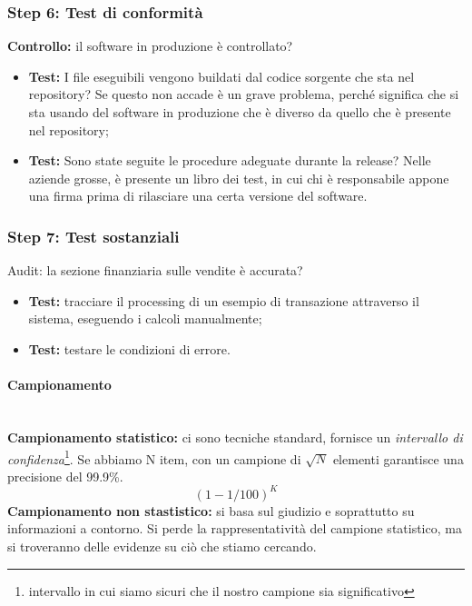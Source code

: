 \subsubsection{Step 6: Test di conformità}

\textbf{Controllo:} il software in produzione è controllato?
\begin{itemize}
\item \textbf{Test:} I file eseguibili vengono buildati dal codice sorgente che
sta nel repository? Se questo non accade è un grave problema, perché significa
che si sta usando del software in produzione che è diverso da quello che è
presente nel repository;
\item \textbf{Test:} Sono state seguite le procedure adeguate durante la
release? Nelle aziende grosse, è presente un libro dei test, in cui chi è
responsabile appone una firma prima di rilasciare una certa versione del
software.
\end{itemize}


\subsubsection{Step 7: Test sostanziali}

Audit: la sezione finanziaria sulle vendite è accurata?

\begin{itemize}
\item \textbf{Test:} tracciare il processing di un esempio di transazione
attraverso il sistema, eseguendo i calcoli manualmente;
\item \textbf{Test:} testare le condizioni di errore.
\end{itemize}


\paragraph{Campionamento}\mbox{}\\

\textbf{Campionamento statistico:} ci sono tecniche standard, fornisce un
\textit{intervallo di confidenza}\footnote{intervallo in cui siamo sicuri che
il nostro campione sia significativo}. Se abbiamo N item, con un campione di
$\sqrt{N}$ elementi garantisce una precisione del 99.9\%.
$$
(1 - 1/100)^K
$$
\newline
\textbf{Campionamento non stastistico:} si basa sul giudizio e soprattutto su
informazioni a contorno. Si perde la rappresentatività del campione statistico,
ma si troveranno delle evidenze su ciò che stiamo cercando.

